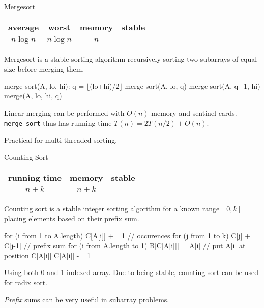 \documentclass{cognito}
\begin{document}

\begin{note}{Mergesort}
	\begin{mdframed}[linecolor=black!25!white]%
	\begin{tabular}{@{} c | c | c | c  @{}}
		\bf average & \bf worst & \bf memory & \bf stable \\
		$n \log n$ & $n \log n$ & $n$ & \checkmark
	\end{tabular}%
	\end{mdframed}
	Mergesort is a stable sorting algorithm recursively sorting two subarrays
	of equal size before merging them.
	\begin{largecode}
merge-sort(A, lo, hi):
	q = $\lfloor$(lo+hi)/2$\rfloor$
	merge-sort(A, lo, q)
	merge-sort(A, q+1, hi)
	merge(A, lo, hi, q)
	\end{largecode}
	Linear merging can be performed with $O(n)$ memory and sentinel cards.
	{\tt merge-sort} thus has running time $T(n) = 2T(n/2) + O(n)$.

	\begin{remark} Practical for multi-threaded sorting.\end{remark}\vspace{-5pt}
\end{note}

\begin{note}{Counting Sort}
	\begin{mdframed}[linecolor=black!25!white]%
	\begin{tabular}{@{} c | c | c  @{}}
		\bf running time & \bf memory & \bf stable \\
		$n + k$ & $n + k$ & \checkmark
	\end{tabular}%
	\end{mdframed}
	Counting sort is a stable integer sorting algorithm for a known range $[0, k]$
	placing elements based on their prefix sum.
	\begin{largecode}
 for (i from 1 to A.length) C[A[i]] += 1 // occurences
 for (j from 1 to k) C[j] += C[j-1] // prefix sum
 for (i from A.length to 1)
 	B[C[A[i]]] = A[i]  // put A[i] at position C[A[i]]
	C[A[i]] -= 1
	\end{largecode}
	\begin{remark} Using both 0 and 1 indexed array. Due to being stable, counting sort can be used for \hyperref[note:Radix Sort]{radix sort}.\end{remark}
	\begin{remark} \emph{Prefix} sums can be very useful in subarray problems.
	\end{remark}\vspace{-5pt}
\end{note}
\end{document}
